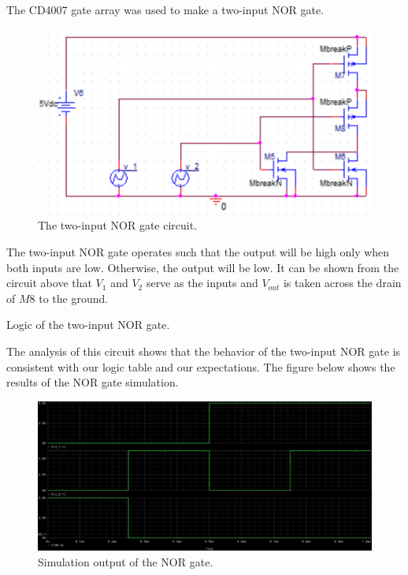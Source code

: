 
The CD4007 gate array was used to make a two-input NOR gate.


\FloatBarrier

\begin{figure}[h!]
\centering
\includegraphics[scale=0.5]{../images/nor_schematic.PNG}
\caption{The two-input NOR gate circuit.}
\label{fig:nor_schematic}
\end{figure}

\FloatBarrier

The two-input NOR gate operates such that the output will be high only when both inputs are low. Otherwise, the output will be low. It can be shown from the circuit above that $V_1$ and $V_2$ serve as the inputs and $V_{out}$ is taken across the drain of $M8$ to the ground.


\FloatBarrier

\begin{table}[h!]
\centering
{}
\caption{Logic of the two-input NOR gate.}
\label{tab:logic_nor.csv}
\end{table}

\FloatBarrier

The analysis of this circuit shows that the behavior of the two-input NOR gate is consistent with our logic table and our expectations. The figure below shows the results of the NOR gate simulation.

\FloatBarrier

\begin{figure}[h!]
\centering
\includegraphics[scale=0.3]{../images/nor_transient_output.PNG}
\caption{Simulation output of the NOR gate.}
\label{fig:nor_transient_output}
\end{figure}

